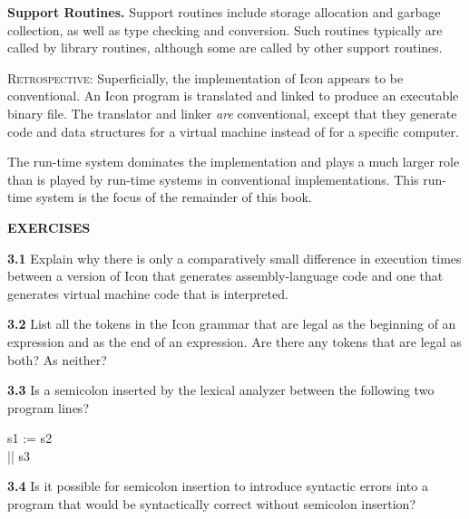 \textbf{Support Routines. }Support routines include storage allocation
and garbage collection, as well as type checking and conversion. Such
routines typically are called by library routines, although some are
called by other support routines.

\textsc{Retrospective}: Superficially, the implementation of Icon
appears to be conventional. An Icon program is translated and linked
to produce an executable binary file. The translator and linker
\textit{are }conventional, except that they generate code and data
structures for a virtual machine instead of for a specific computer.

The run-time system dominates the implementation and plays a much
larger role than is played by run-time systems in conventional
implementations. This run-time system is the focus of the remainder of
this book.

\bigskip

\noindent\textbf{EXERCISES}

\textbf{3.1} Explain why there is only a comparatively small difference
in execution times between a version of Icon that generates
assembly-language code and one that generates virtual machine code
that is interpreted.

\textbf{3.2} List all the tokens in the Icon grammar that are legal as the
beginning of an expression and as the end of an expression. Are there
any tokens that are legal as both? As neither?

\textbf{3.3} Is a semicolon inserted by the lexical analyzer between the
following two program lines?

\begin{iconcode}
\>s1 := s2\\
\>|| s3
\end{iconcode}

\textbf{3.4} Is it possible for semicolon insertion to introduce
syntactic errors into a program that would be syntactically correct
without semicolon insertion?

